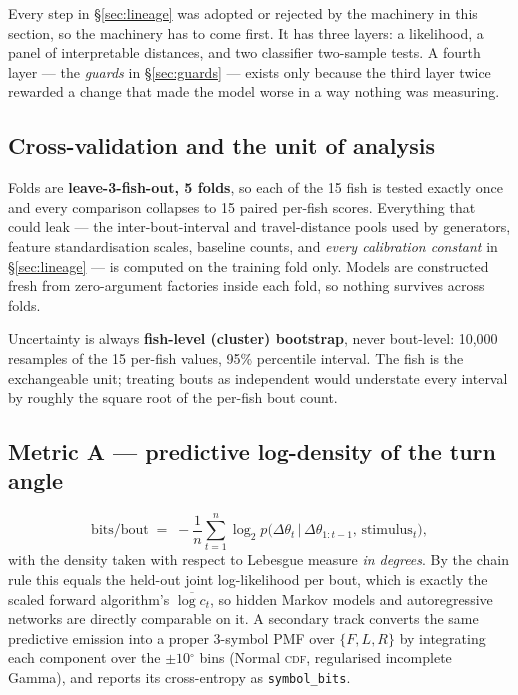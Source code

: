 \documentclass[11pt,a4paper]{article}
\newcommand{\dg}{\ensuremath{^\circ}}             %
\newcommand{\dth}{\ensuremath{\Delta\theta}}
\newcommand{\code}[1]{\texttt{\small #1}}
\begin{document}
Every step in \S\ref{sec:lineage} was adopted or rejected by the machinery in this
section, so the machinery has to come first. It has three layers: a likelihood, a panel
of interpretable distances, and two classifier two-sample tests. A fourth layer --- the
\emph{guards} in \S\ref{sec:guards} --- exists only because the third layer twice
rewarded a change that made the model worse in a way nothing was measuring.

\subsection{Cross-validation and the unit of analysis}

Folds are \textbf{leave-3-fish-out, 5 folds}, so each of the 15 fish is tested exactly
once and every comparison collapses to 15 paired per-fish scores. Everything that could
leak --- the inter-bout-interval and travel-distance pools used by generators, feature
standardisation scales, baseline counts, and \emph{every calibration constant} in
\S\ref{sec:lineage} --- is computed on the training fold only. Models are constructed
fresh from zero-argument factories inside each fold, so nothing survives across folds.

Uncertainty is always \textbf{fish-level (cluster) bootstrap}, never bout-level: 10{,}000
resamples of the 15 per-fish values, 95\% percentile interval. The fish is the
exchangeable unit; treating bouts as independent would understate every interval by
roughly the square root of the per-fish bout count.

\subsection{Metric A --- predictive log-density of the turn angle}

\begin{equation}
\text{bits/bout} \;=\; -\frac{1}{n}\sum_{t=1}^{n}
   \log_2 p\bigl(\dth_t \,\big|\, \dth_{1:t-1},\, \text{stimulus}_t\bigr),
\end{equation}
with the density taken with respect to Lebesgue measure \emph{in degrees}. By the chain
rule this equals the held-out joint log-likelihood per bout, which is exactly the scaled
forward algorithm's $\overline{\log c_t}$, so hidden Markov models and autoregressive
networks are directly comparable on it. A secondary track converts the same predictive
emission into a proper 3-symbol PMF over $\{F,L,R\}$ by integrating each component over
the $\pm10\dg$ bins (Normal \textsc{cdf}, regularised incomplete Gamma), and
reports its cross-entropy as \code{symbol\_bits}.
\end{document}
